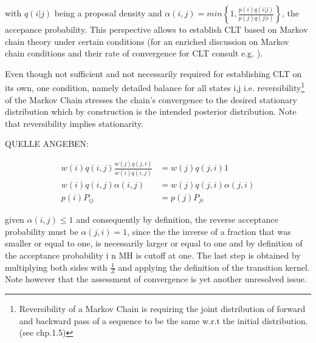 \documentclass[11pt]{article}
\begin{document}
        with $q(i|j)$ being a proposal density and $\alpha(i,j) = min\left\{1, \frac{p(i)q(i|j)}{p(j)q(j|i)} \right\}$, the accepance probability. This perspective allows to establish CLT based on Markov chain theory under certain conditions (for an enriched discussion on Markov chain conditions and their rate of convergence for CLT consult e.g. \citep{jones2004markov}).


        Even though not sufficient and not necessarily required for establishing CLT on its own, one condition, namely detailed balance for all states i,j i.e. reversibility\footnote{Reversibility of a Markov Chain is requiring the joint distribution of forward and backward pass of a sequence to be the same w.r.t the initial distribution. (see \citep{brooks2011handbook} chp.1.5)} of the Markov Chain stresses the chain's convergence to the desired stationary distribution which by construction is the intended posterior distribution. Note that reversibility implies stationarity.

        QUELLE ANGEBEN:

        \begin{align*}
        \label{MHdetailed}
            w(i)q(i,j)\frac{w(j)q(j,i)}{w(i)q(i,j)} &= w(j)q(j,i) 1 \\
            w(i)q(i,j)\alpha(i,j) &=  w(j)q(j,i)\alpha(j,i)         \\
            p(i)P_{ij} &= p(j)P_{ji}
        \end{align*}

        given $\alpha(i,j) \leq 1$  and consequently by definition, the reverse acceptance probability must be $\alpha(j,i) = 1$, since the the inverse of a fraction that was smaller or equal to one, is necessarily larger or equal to one and by definition of the acceptance probability i n MH is cutoff at one.
        The last step is obtained by multiplying both sides with $\frac{1}{Z}$ and applying the definition of the transition kernel.
        Note however that the assessment of convergence is yet another unresolved issue.
\end{document}
